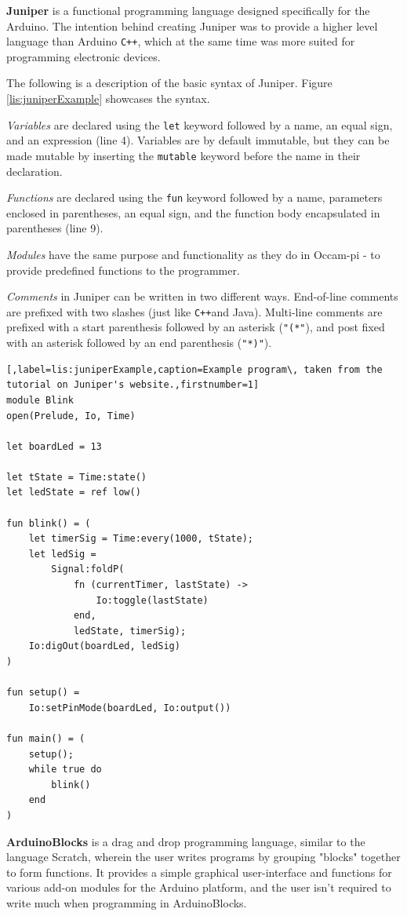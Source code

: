 \textbf{Juniper} is a functional programming language designed specifically for the Arduino.
The intention behind creating Juniper was to provide a higher level language than Arduino \texttt{C++}, which at the same time was more suited for programming electronic devices\cite{JuniperTutorial}.

The following is a description of the basic syntax of Juniper. 
Figure \ref{lis:juniperExample} showcases the syntax.

\textit{Variables} are declared using the \texttt{let} keyword followed by a name, an equal sign, and an expression (line 4).
Variables are by default immutable, but they can be made mutable by inserting the \texttt{mutable} keyword before the name in their declaration.

\textit{Functions} are declared using the \texttt{fun} keyword followed by a name, parameters enclosed in parentheses, an equal sign, and the function body encapsulated in parentheses (line 9).

\textit{Modules} have the same purpose and functionality as they do in Occam-pi - to provide predefined functions to the programmer.

\textit{Comments} in Juniper can be written in two different ways.
End-of-line comments are prefixed with two slashes (just like \texttt{C++}and Java).
Multi-line comments are prefixed with a start parenthesis followed by an asterisk (\texttt{"(*"}), and post fixed with an asterisk followed by an end parenthesis (\texttt{"*)"}).

\begin{lstlisting}[,label=lis:juniperExample,caption=Example program\, taken from the tutorial on Juniper's website.,firstnumber=1]
module Blink
open(Prelude, Io, Time)

let boardLed = 13

let tState = Time:state()
let ledState = ref low()

fun blink() = (
	let timerSig = Time:every(1000, tState);
	let ledSig =
		Signal:foldP(
			fn (currentTimer, lastState) ->
				Io:toggle(lastState)
			end,
			ledState, timerSig);
	Io:digOut(boardLed, ledSig)
)

fun setup() =
	Io:setPinMode(boardLed, Io:output())

fun main() = (
	setup();
	while true do
		blink()
	end
)
\end{lstlisting}

\textbf{ArduinoBlocks} is a drag and drop programming language, similar to the language Scratch, wherein the user writes programs by grouping "blocks" together to form functions.
It provides a simple graphical user-interface and functions for various add-on modules for the Arduino platform, and the user isn't required to write much when programming in ArduinoBlocks.

